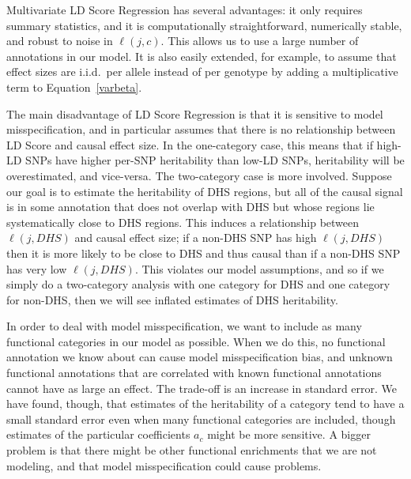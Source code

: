 \documentclass[11pt]{article}
\begin{document}
Multivariate LD Score Regression has several advantages: it only requires summary statistics, and it is computationally straightforward, numerically stable, and robust to noise in $\ell(j,c)$. This allows us to use a large number of annotations in our model. It is also easily extended, for example, to assume that effect sizes are i.i.d.\ per allele instead of per genotype by adding a multiplicative term to Equation~\eqref{varbeta}. 

The main disadvantage of LD Score Regression is that it is sensitive to model misspecification, and in particular assumes that there is no relationship between LD Score and causal effect size. In the one-category case, this means that if high-LD SNPs have higher per-SNP heritability than low-LD SNPs, heritability will be overestimated, and vice-versa. The two-category case is more involved. Suppose our goal is to estimate the heritability of DHS regions, but all of the causal signal is in some annotation that does not overlap with DHS but whose regions lie systematically close to DHS regions. This induces a relationship between $\ell(j,DHS)$ and causal effect size; if a non-DHS SNP has high $\ell(j,DHS)$ then it is more likely to be close to DHS and thus causal than if a non-DHS SNP has very low $\ell(j,DHS)$. This violates our model assumptions, and so if we simply do a two-category analysis with one category for DHS and one category for non-DHS, then we will see inflated estimates of DHS heritability.

In order to deal with model misspecification, we want to include as many functional categories in our model as possible. When we do this, no functional annotation we know about can cause model misspecification bias, and unknown functional annotations that are correlated with known functional annotations cannot have as large an effect. The trade-off is an increase in standard error. We have found, though, that estimates of the heritability of a category tend to have a small standard error even when many functional categories are included, though estimates of the particular coefficients $a_c$ might be more sensitive. A bigger problem is that there might be other functional enrichments that we are not modeling, and that model misspecification could cause problems. 
\end{document}

